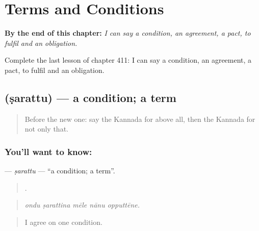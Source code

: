 
\chapter{Terms and Conditions}
\label{ch:ka-terms-and-conditions}

\begin{chapteropening}
\textbf{By the end of this chapter:} \emph{I can say a condition, an agreement, a pact, to fulfil and an obligation.}

Complete the last lesson of chapter 411: I can say a condition, an agreement, a pact, to fulfil and an obligation.
\end{chapteropening}

\section[\texorpdfstring{\kn{ಷರತ್ತು} (ṣarattu)}{ಷರತ್ತು (ṣarattu)}]{ (ṣarattu) — a condition; a term}

\label{lesson:KA-C411-sarattu}



\begin{quote}
Before the new one: say the Kannada for above all, then the Kannada for not only that.
\end{quote}

\subsection*{You'll want to know: }
\textbf{} — \emph{ṣarattu} — \textquotedblleft{}a condition; a term\textquotedblright{}.

\begin{quote}
    .
\end{quote}

\begin{quote}
\emph{ondu ṣarattina mēle nānu opputtēne.}
\end{quote}

\begin{quote}
I agree on one condition.
\end{quote}

